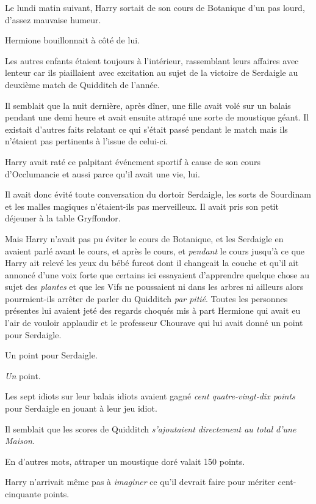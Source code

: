 \later

Le lundi matin suivant, Harry sortait de son cours de Botanique d'un pas lourd, d'assez mauvaise humeur.

Hermione bouillonnait à côté de lui.

Les autres enfants étaient toujours à l'intérieur, rassemblant leurs affaires avec lenteur car ils piaillaient avec excitation au sujet de la victoire de Serdaigle au deuxième match de Quidditch de l'année.

Il semblait que la nuit dernière, après dîner, une fille avait volé sur un balais pendant une demi heure et avait ensuite attrapé une sorte de moustique géant. Il existait d'autres faits relatant ce qui s'était passé pendant le match mais ils n'étaient pas pertinents à l'issue de celui-ci.

Harry avait raté ce palpitant événement sportif à cause de son cours d'Occlumancie et aussi parce qu'il avait une vie, lui.

Il avait donc évité toute conversation du dortoir Serdaigle, les sorts de Sourdinam et les malles magiques n'étaient-ils pas merveilleux. Il avait pris son petit déjeuner à la table Gryffondor.

Mais Harry n'avait pas pu éviter le cours de Botanique, et les Serdaigle en avaient parlé avant le cours, et après le cours, et \emph{pendant} le cours jusqu'à ce que Harry ait relevé les yeux du bébé furcot dont il changeait la couche et qu'il ait annoncé d'une voix forte que certains ici essayaient d'apprendre quelque chose au sujet des \emph{plantes} et que les Vifs ne poussaient ni dans les arbres ni ailleurs alors pourraient-ils arrêter de parler du Quidditch \emph{par pitié}. Toutes les personnes présentes lui avaient jeté des regards choqués mis à part Hermione qui avait eu l'air de vouloir applaudir et le professeur Chourave qui lui avait donné un point pour Serdaigle.

Un point pour Serdaigle.

\emph{Un} point.

Les sept idiots sur leur balais idiots avaient gagné \emph{cent quatre-vingt-dix points} pour Serdaigle en jouant à leur jeu idiot.

Il semblait que les scores de Quidditch \emph{s'ajoutaient directement au total d'une Maison}.

En d'autres mots, attraper un moustique doré valait 150 points.

Harry n'arrivait même pas à \emph{imaginer} ce qu'il devrait faire pour mériter cent-cinquante points.

